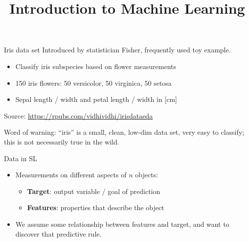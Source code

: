 \documentclass[11pt,compress,t,notes=noshow, xcolor=table]{beamer}
\title{Introduction to Machine Learning}
\begin{document}


\begin{frame}{Iris data set}
Introduced by statistician Fisher,  frequently used toy example.
\begin{itemize}
\item Classify iris subspecies based on flower measurements
\item 150 iris flowers: 50 versicolor, 50 virginica, 50 setosa
\item Sepal length / width and petal length / width in [cm]
\end{itemize}


\begin{center}
\begin{tiny}
Source: \url{https://rpubs.com/vidhividhi/irisdataeda}
\end{tiny}
\end{center}

Word of warning: ``iris'' is a small, clean, low-dim data set, very easy to classify; this is not necessarily true in the wild. 
\end{frame}


\begin{frame}{Data in SL}
\begin{itemize}
\item Measurements on different aspects of $n$ objects:
\begin{itemize}
  \item \textbf{Target}: output variable / goal of prediction
  \item \textbf{Features}: properties that describe the object
\end{itemize}
\item We assume some relationship between features and target, and want to discover that predictive rule.
\end{itemize}
\vfill
{}
{
 
}
\end{frame}
\end{document}
